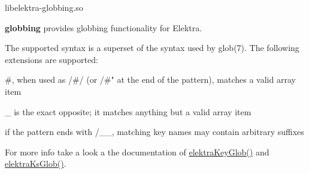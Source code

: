 \begin{DoxyVerb}libelektra-globbing.so
\end{DoxyVerb}


{\bfseries globbing} provides globbing functionality for Elektra.

The supported syntax is a superset of the syntax used by {\ttfamily glob(7)}. The following extensions are supported\+:


\begin{DoxyItemize}
\item {\ttfamily \#}, when used as {\ttfamily /\#/} (or {\ttfamily /\#"} at the end of the pattern), matches a valid array item
\item {\ttfamily \+\_\+} is the exact opposite; it matches anything but a valid array item
\item if the pattern ends with {\ttfamily /\+\_\+\+\_\+}, matching key names may contain arbitrary suffixes
\end{DoxyItemize}

For more info take a look a the documentation of {\ttfamily \hyperlink{globbing_8c_ad7700821df72fc0fc3bfc336e4368d29}{elektra\+Key\+Glob()}} and {\ttfamily \hyperlink{globbing_8c_a85baa9c79325ad1bf08e95cd82a4daf6}{elektra\+Ks\+Glob()}}. 